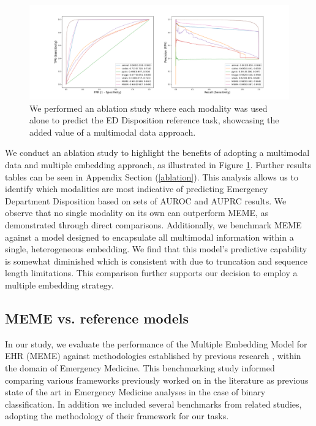 \documentclass[pmlr]{jmlr}%
\begin{document}
\begin{figure}[h!]
   \centering 
   \includegraphics[width=\textwidth]{results.png} 
   \vspace*{-0.5cm}
   \caption{We performed an ablation study where each modality was used alone to predict the ED Disposition reference task, showcasing the added value of a multimodal data approach.}
   \label{abs} 
 \end{figure} 
\vspace*{-0.5cm}
We conduct an ablation study to highlight the benefits of adopting a multimodal data and multiple embedding approach, as illustrated in Figure \ref{abs}. Further results tables can be seen in Appendix Section (\ref{ablation}). This analysis allows us to identify which modalities are most indicative of predicting Emergency Department Disposition based on sets of AUROC and AUPRC results. We observe that no single modality on its own can outperform MEME, as demonstrated through direct comparisons. Additionally, we benchmark MEME against a model designed to encapsulate all multimodal information within a single, heterogeneous embedding. We find that this model's predictive capability is somewhat diminished which is consistent with \citep{rupp_exbehrt_2023} due to truncation and sequence length limitations. This comparison further supports our decision to employ a multiple embedding strategy.

\subsection{MEME vs. reference models}

In our study, we evaluate the performance of the Multiple Embedding Model for EHR (MEME) against methodologies established by previous research \citep{xie2022benchmarking}, within the domain of Emergency Medicine. This benchmarking study informed comparing various frameworks  previously worked on in the literature as previous state of the art in Emergency Medicine analyses in the case of binary classification. In addition we included several benchmarks from related studies, adopting the methodology of their framework for our tasks.
\end{document}
